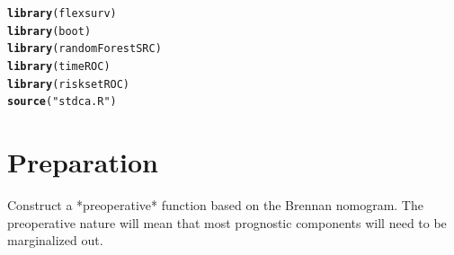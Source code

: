 \documentclass{article}\usepackage[]{graphicx}\usepackage[]{color}
\makeatletter
\newcommand{\hlstr}[1]{\textcolor[rgb]{0.192,0.494,0.8}{#1}}%
\newcommand{\hlstd}[1]{\textcolor[rgb]{0.345,0.345,0.345}{#1}}%
\newcommand{\hlkwd}[1]{\textcolor[rgb]{0.737,0.353,0.396}{\textbf{#1}}}%
\newenvironment{kframe}{%
 \def\at@end@of@kframe{}%
 \ifinner\ifhmode%
  \def\at@end@of@kframe{\end{minipage}}%
  \begin{minipage}{\columnwidth}%
 \fi\fi%
 \def\FrameCommand##1{\hskip\@totalleftmargin \hskip-\fboxsep
 \colorbox{shadecolor}{##1}\hskip-\fboxsep
     \hskip-\linewidth \hskip-\@totalleftmargin \hskip\columnwidth}%
 \MakeFramed {\advance\hsize-\width
   \@totalleftmargin\z@ \linewidth\hsize
   \@setminipage}}%
 {\par\unskip\endMakeFramed%
 \at@end@of@kframe}
\newenvironment{knitrout}{}{} %
\makeatother
\begin{document}
\begin{knitrout}
\color{fgcolor}\begin{kframe}
\begin{alltt}
\hlkwd{library}\hlstd{(flexsurv)}
\hlkwd{library}\hlstd{(boot)}
\hlkwd{library}\hlstd{(randomForestSRC)}
\hlkwd{library}\hlstd{(timeROC)}
\hlkwd{library}\hlstd{(risksetROC)}
\hlkwd{source}\hlstd{(}\hlstr{"stdca.R"}\hlstd{)}
\end{alltt}
\end{kframe}
\end{knitrout}


\section{Preparation}
Construct a *preoperative* function based on the Brennan nomogram.  The preoperative nature will mean that most prognostic components will need to be marginalized out.
\end{document}
